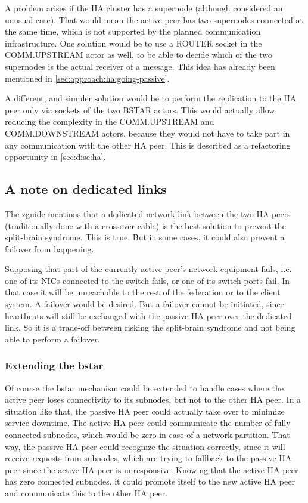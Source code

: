 A problem arises if the HA cluster has a supernode (although
considered an unusual case). That would mean the active peer has two supernodes
connected at the same time, which is not supported by the planned communication
infrastructure. One solution would be to use a ROUTER socket in the
COMM.UPSTREAM actor as well, to be able to decide which of the two supernodes
is the actual receiver of a message. This idea has already been mentioned in
\autoref{sec:approach:ha:going-passive}.

A different, and simpler solution would be to perform the
replication to the HA peer only via sockets of the two BSTAR actors. This would
actually allow reducing the complexity in the COMM.UPSTREAM and COMM.DOWNSTREAM
actors, because they would not have to take part in any communication with the
other HA peer. This is described as a refactoring opportunity in
\autoref{sec:disc:ha}.

\subsection{A note on dedicated links}
The \gls{zguide} mentions that a dedicated network link between the two HA peers
(traditionally done with a crossover cable) is the best solution to prevent the
split-brain syndrome. This is true. But in some cases, it could also prevent a
failover from happening.

Supposing that part of the currently active peer's network equipment fails, i.e. one
of its \glspl{NIC} connected to the switch fails, or one of its switch ports
fail. In that case it will be unreachable to the rest of the
federation or to the client system. A failover would be desired. But a failover
cannot be initiated, since heartbeats will still be exchanged with the passive HA peer over
the dedicated link. So it is a trade-off between risking the split-brain
syndrome and not being able to perform a failover.

\subsubsection{Extending the \gls{bstar}}\label{sec:approach:ha:bstar-ext}
Of course the \gls{bstar} mechanism could be extended to handle cases where the
active peer loses connectivity to its subnodes, but not to the other HA peer. In
a situation like that, the passive HA peer could actually take over to minimize
service downtime. The active HA peer could communicate the number of fully connected subnodes,
which would be zero in case of a network partition. That way, the
passive HA peer could recognize the situation correctly, since it will receive
requests from subnodes, which are trying to fallback to the passive HA peer since
the active HA peer is unresponsive. Knowing that the active HA peer has zero
connected subnodes, it could promote itself to the new active HA peer and
communicate this to the other HA peer.

